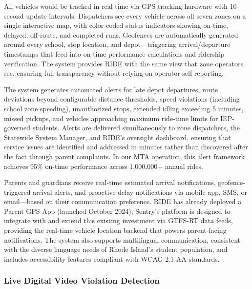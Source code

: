 \begin{description}[style=nextline, leftmargin=0.5cm]
    \item[\faIcon{satellite} \textbf{Live Vehicle Tracking:}] All vehicles would be tracked in real time via GPS tracking hardware with 10-second update intervals. Dispatchers see every vehicle across all seven zones on a single interactive map, with color-coded status indicators showing on-time, delayed, off-route, and completed runs. Geofences are automatically generated around every school, stop location, and depot---triggering arrival/departure timestamps that feed into on-time performance calculations and ridership verification. The system provides RIDE with the same view that zone operators see, ensuring full transparency without relying on operator self-reporting.

    \item[\faIcon{bell} \textbf{Automated Alerts:}] The system generates automated alerts for late depot departures, route deviations beyond configurable distance thresholds, speed violations (including school zone speeding), unauthorized stops, extended idling exceeding 5 minutes, missed pickups, and vehicles approaching maximum ride-time limits for IEP-governed students. Alerts are delivered simultaneously to zone dispatchers, the Statewide System Manager, and RIDE's oversight dashboard, ensuring that service issues are identified and addressed in minutes rather than discovered after the fact through parent complaints. In our MTA operation, this alert framework achieves 95\% on-time performance across 1,000,000+ annual rides.

    \item[\faIcon{mobile-alt} \textbf{Parent Communication:}] Parents and guardians receive real-time estimated arrival notifications, geofence-triggered arrival alerts, and proactive delay notifications via mobile app, SMS, or email---based on their communication preference. RIDE has already deployed a Parent GPS App (launched October 2024); Sentry's platform is designed to integrate with and extend this existing investment via GTFS-RT data feeds, providing the real-time vehicle location backend that powers parent-facing notifications. The system also supports multilingual communication, consistent with the diverse language needs of Rhode Island's student population, and includes accessibility features compliant with WCAG 2.1 AA standards.
\end{description}

\subsubsection{Live Digital Video Violation Detection}


